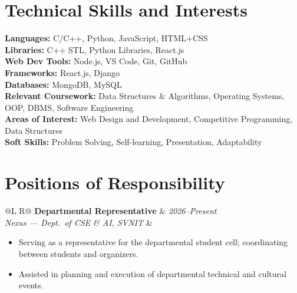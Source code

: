 \documentclass[a4paper,10pt]{article}
\makeatletter
\newcommand{\entry}[4]{%
  \vspace{0.6mm}
  \noindent\begin{tabularx}{\textwidth}{@{}L R@{}}
    \textbf{#1} & \textit{\small #2} \\
    \textit{\small #3} & \textit{\small #4} \\
  \end{tabularx}\par
}
\makeatother
\begin{document}
\section{Technical Skills and Interests}
\noindent\small
\textbf{Languages:} C/C++, Python, JavaScript, HTML+CSS \\[0.4mm]
\textbf{Libraries:} C++ STL, Python Libraries, React.js \\[0.4mm]
\textbf{Web Dev Tools:} Node.js, VS Code, Git, GitHub \\[0.4mm]
\textbf{Frameworks:} React.js, Django \\[0.4mm]
\textbf{Databases:} MongoDB, MySQL \\[0.4mm]
\textbf{Relevant Coursework:} Data Structures \& Algorithms, Operating Systems, OOP, DBMS, Software Engineering \\[0.4mm]
\textbf{Areas of Interest:} Web Design and Development, Competitive Programming, Data Structures \\[0.4mm]
\textbf{Soft Skills:} Problem Solving, Self-learning, Presentation, Adaptability

\section{Positions of Responsibility}
\entry{Departmental Representative}{2026--Present}{Nexus --- Dept.\ of CSE \& AI, SVNIT}{}
\begin{itemize}
  \item Serving as a representative for the departmental student cell; coordinating between students and organizers.
  \item Assisted in planning and execution of departmental technical and cultural events.
\end{itemize}
\end{document}
